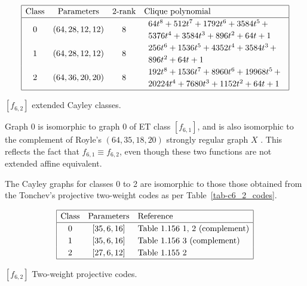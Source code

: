 \documentclass[12pt,a4paper]{article}
\begin{document}
\begin{table}[!bhpt] %
%
\small{}
\begin{align*}
\def\arraystretch{1.2}
\begin{array}{|cccl|}
\hline
\text{Class} &
\text{Parameters} &
\text{2-rank} &
\text{Clique polynomial}
\\
\hline
0 &
(64, 28, 12, 12) &
8 &
\begin{array}{l}
64t^{8} + 512t^{7} + 1792t^{6} + 3584t^{5}
\,+
\\
 5376t^{4} + 3584t^{3} + 896t^{2} + 64t + 1
\end{array}
\\
1 &
(64, 28, 12, 12) &
8 &
\begin{array}{l}
256t^{6} + 1536t^{5} + 4352t^{4} + 3584t^{3}
\,+
\\
 896t^{2} + 64t + 1
\end{array}
\\
2 &
(64, 36, 20, 20) &
8 &
\begin{array}{l}
192t^{8} + 1536t^{7} + 8960t^{6} + 19968t^{5}
\,+
\\
 20224t^{4} + 7680t^{3} + 1152t^{2} + 64t + 1
\end{array}
\\
\hline
\end{array}
\end{align*}
%
\caption{$[f_{6,2}]$ extended Cayley classes.}
\label{tab-c6_2_EC_classes}
\end{table}

Graph 0 is isomorphic to graph 0 of ET class $[f_{6,1}]$,
and is also isomorphic to the complement of Royle's $(64,35,18,20)$ strongly regular graph $X$
\cite{Roy08normal}.
This reflects the fact that $f_{6,1} \equiv f_{6,2}$, even though these two functions are not
extended affine equivalent.
%
%

The Cayley graphs for classes 0 to 2 are isomorphic to those those obtained from the
Tonchev's projective two-weight codes \cite{Ton07codes} as per Table~\ref{tab-c6_2_codes}.

\begin{table}[!bhpt] %
\small{
\begin{align*}
\def\arraystretch{1.2}
\begin{array}{|ccl|}
\hline
\text{Class} &
\text{Parameters} & \text{Reference}
\\
\hline
0 & [35,6,16] & \text{Table 1.156 1, 2 (complement)}
\\
1 & [35,6,16] & \text{Table 1.156 3 (complement)}
\\
2 & [27,6,12] & \text{Table 1.155 2 }
\\
\hline
\end{array}
\end{align*}
}
\caption{$[f_{6,2}]$ Two-weight projective codes.}
\label{tab-c6_2_codes}
\end{table}
\end{document}
